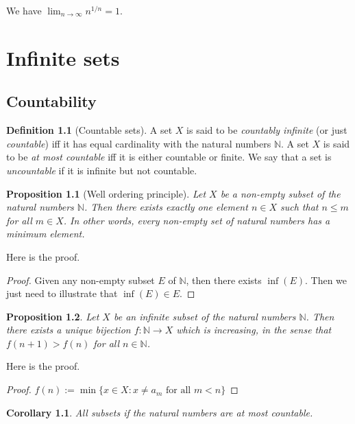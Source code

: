 \documentclass[
]{book}
\newtheorem{corollary}{Corollary}[chapter]
\newtheorem{proposition}{Proposition}[chapter]
\theoremstyle{definition}
\newtheorem{definition}{Definition}[chapter]
\theoremstyle{definition}
\theoremstyle{definition}
\theoremstyle{definition}
\theoremstyle{remark}
\begin{document}
We have \(\lim_{n\to \infty}n^{1/n}=1\).

\chapter{Infinite sets}\label{infinite}

\section{Countability}\label{countability}

\begin{definition}[Countable sets]
A set \(X\) is said to be \emph{countably infinite} (or just \emph{countable}) iff it has equal cardinality with the natural numbers \(\mathbb{N}\). A set \(X\) is said to be \emph{at most countable} iff it is either countable or finite. We say that a set is \emph{uncountable} if it is infinite but not countable.
\end{definition}

\begin{proposition}[Well ordering principle]
Let \(X\) be a non-empty subset of the natural numbers \(\mathbb{N}\). Then there exists exactly one element \(n\in X\) such that \(n\leq m\) for all \(m\in X\). In other words, every non-empty set of natural numbers has a minimum element.
\end{proposition}

Here is the proof.

\begin{proof}
Given any non-empty subset \(E\) of \(\mathbb{N}\), then there exists \(\inf(E)\). Then we just need to illustrate that \(\inf(E)\in E\).
\end{proof}

\begin{proposition}
Let \(X\) be an infinite subset of the natural numbers \(\mathbb{N}\). Then there exists a unique bijection \(f:\mathbb{N} \to X\) which is increasing, in the sense that \(f(n+1)>f(n)\) for all \(n\in\mathbb{N}\).
\end{proposition}

Here is the proof.

\begin{proof}
\(f(n):=\min\{x\in X:x\ne a_m\text{ for all }m<n \}\)
\end{proof}

\begin{corollary}
All subsets if the natural numbers are at most countable.
\end{corollary}
\end{document}
